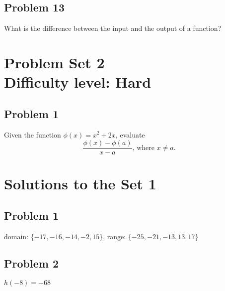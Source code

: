 \documentclass[12pt]{article}
\begin{document}
\subsection*{Problem 13}
What is the difference between the input and the output of a function?

\section*{Problem Set 2\\Difficulty level: Hard}
\subsection*{Problem 1}
Given the function \(\phi(x)=x^2+2x\), evaluate
\[\dfrac{\phi(x)-\phi(a)}{x-a} \text{, where } x \not= a.\]


\newpage
\section*{Solutions to the Set 1}
\subsection*{Problem 1}
domain: \(\{-17,-16,-14,-2,15\}\), range: \(\{-25,-21,-13,13,17\}\)
\subsection*{Problem 2}
\(h(-8)=-68\)
\end{document}

